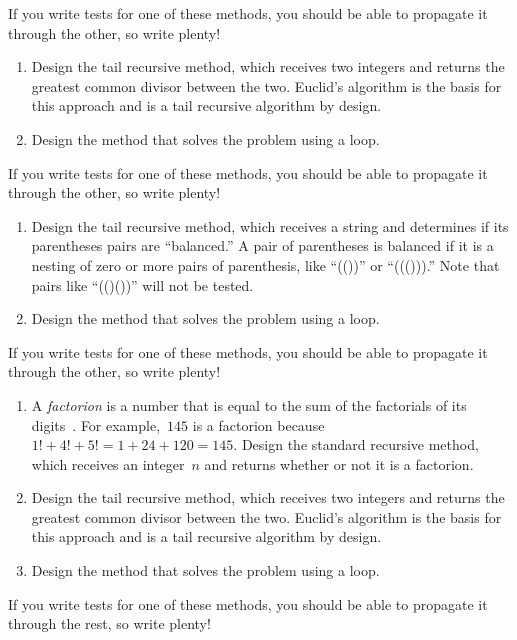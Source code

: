 If you write tests for one of these methods, you should be able to propagate it through the other, so write plenty!

\begin{enumerate}[label=(\alph*)]
    \item Design the  tail recursive method, which receives two integers and returns the greatest common divisor between the two. Euclid's algorithm is the basis for this approach and is a tail recursive algorithm by design.
    \item Design the  method that solves the problem using a loop.

\end{enumerate}
If you write tests for one of these methods, you should be able to propagate it through the other, so write plenty!


\begin{enumerate}[label=(\alph*)]
    \item Design the  tail recursive method, which receives a string and determines if its parentheses pairs are ``balanced.'' A pair of parentheses is balanced if it is a nesting of zero or more pairs of parenthesis, like ``(())'' or ``((())).'' Note that pairs like ``(()())'' will not be tested.
    \item Design the  method that solves the problem using a loop.
\end{enumerate}
If you write tests for one of these methods, you should be able to propagate it through the other, so write plenty!


\begin{enumerate}[label=(\alph*)]
    \item A \textit{factorion} is a number that is equal to the sum of the factorials of its digits~. 
    For example,~$145$ is a factorion because $1! + 4! + 5! = 1 + 24 + 120 = 145$. 
    Design the standard recursive  method, which receives an integer~$n$ and returns whether or not it is a factorion. 
    \item Design the  tail recursive method, which receives two integers and returns the greatest common divisor between the two. Euclid's algorithm is the basis for this approach and is a tail recursive algorithm by design.
    \item Design the  method that solves the problem using a loop.
\end{enumerate}
If you write tests for one of these methods, you should be able to propagate it through the rest, so write plenty!


